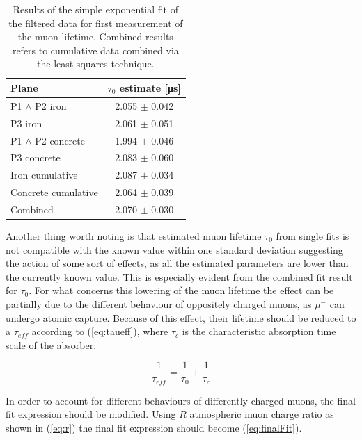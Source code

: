 \documentclass[../main.tex]{subfiles}
\begin{document}
\begin{table}[htb!]
    \caption{Results of the simple exponential fit of the filtered data for first measurement of the muon lifetime. Combined results refers to cumulative data combined via the least squares technique.}
    \label{tab:resultsSimple}
    \centering
        \begin{tabular}{|l|c|}
        \hline
        Plane & $\tau_0$ estimate [\si{\micro \second}] \\ \hline
        P1 $\land$ P2 iron        & 2.055 $\pm$ 0.042 \\
        P3 iron           & 2.061 $\pm$ 0.051 \\
        P1 $\land$ P2 concrete    & 1.994 $\pm$ 0.046 \\
        P3 concrete       & 2.083 $\pm$ 0.060 \\ \hline
        Iron cumulative     & 2.087 $\pm$ 0.034 \\
        Concrete cumulative & 2.064 $\pm$ 0.039 \\ \hline
        Combined & 2.070 $\pm$ 0.030 \\ \hline
        \end{tabular}
\end{table}

\FloatBarrier

Another thing worth noting is that estimated muon lifetime $\tau_0$ from single fits is not compatible with the known value within one standard deviation suggesting the action of some sort of effects, as all the estimated parameters are lower than the currently known value. This is especially evident from the combined fit result for $\tau_0$. For what concerns this lowering of the muon lifetime the effect can be partially due to the different behaviour of oppositely charged muons, as $\mu^-$ can undergo atomic capture. Because of this effect, their lifetime should be reduced to a $\tau_{eff}$ according to (\ref{eq:taueff}), where $\tau_c$ is the characteristic absorption time scale of the absorber.

\begin{equation}
    \frac{1}{\tau_{eff}} = \frac{1}{\tau_0}+\frac{1}{\tau_c}
    \label{eq:taueff}
\end{equation}

In order to account for different behaviours of differently charged muons, the final fit expression should be modified. Using $R$ atmospheric muon charge ratio as shown in (\ref{eq:r}) the final fit expression should become (\ref{eq:finalFit}).
\end{document}
